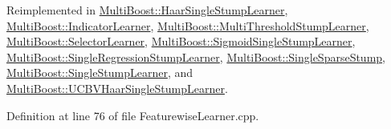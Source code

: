 Reimplemented in \hyperlink{classMultiBoost_1_1HaarSingleStumpLearner_a6a565277105954f5912937ad00b92f1f}{MultiBoost::HaarSingleStumpLearner}, \hyperlink{classMultiBoost_1_1IndicatorLearner_a66dfec334db068b3ab5806723b4170b4}{MultiBoost::IndicatorLearner}, \hyperlink{classMultiBoost_1_1MultiThresholdStumpLearner_a0dd15d2b44a067988ff2496e2efe5aab}{MultiBoost::MultiThresholdStumpLearner}, \hyperlink{classMultiBoost_1_1SelectorLearner_a1d51fa000c5b04e5ed52dcb8f2981e5a}{MultiBoost::SelectorLearner}, \hyperlink{classMultiBoost_1_1SigmoidSingleStumpLearner_a974bf887a0c8ddf5be49259d702c9b05}{MultiBoost::SigmoidSingleStumpLearner}, \hyperlink{classMultiBoost_1_1SingleRegressionStumpLearner_a08dc78b056b0f939214637f60e50891d}{MultiBoost::SingleRegressionStumpLearner}, \hyperlink{classMultiBoost_1_1SingleSparseStump_a69365508ff9efa93d90450621048905e}{MultiBoost::SingleSparseStump}, \hyperlink{classMultiBoost_1_1SingleStumpLearner_a25bb9b4151a2a4f547994ef71a2cf152}{MultiBoost::SingleStumpLearner}, and \hyperlink{classMultiBoost_1_1UCBVHaarSingleStumpLearner_a9844f395b5e9315e32e46ec27df50a75}{MultiBoost::UCBVHaarSingleStumpLearner}.



Definition at line 76 of file FeaturewiseLearner.cpp.


